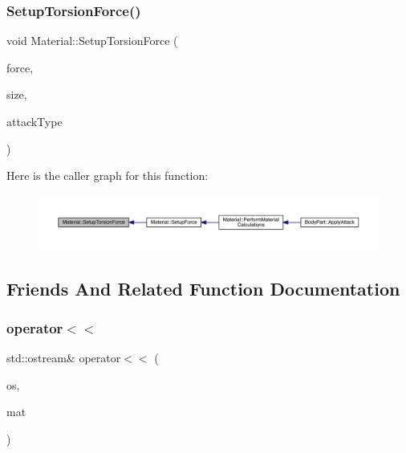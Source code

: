 \subsubsection{\texorpdfstring{Setup\+Torsion\+Force()}{SetupTorsionForce()}}
{\footnotesize\ttfamily void Material\+::\+Setup\+Torsion\+Force (\begin{DoxyParamCaption}\item[{float}]{force,  }\item[{float}]{size,  }\item[{\mbox{\hyperlink{_enum_types_8hpp_a904b2f9c8f3951116c343784c59d6afe}{Attack\+Type}}}]{attack\+Type }\end{DoxyParamCaption})\hspace{0.3cm}{\ttfamily [private]}}

Here is the caller graph for this function\+:
\nopagebreak
\begin{figure}[H]
\begin{center}
\leavevmode
\includegraphics[width=350pt]{dc/dee/class_material_a767010a40d459c05e14afc641217a21b_icgraph}
\end{center}
\end{figure}


\subsection{Friends And Related Function Documentation}
\mbox{\label{class_material_a5bfba11792fa55afcf4fec622c4a4f4b}} 
\subsubsection{\texorpdfstring{operator$<$$<$}{operator<<}}
{\footnotesize\ttfamily std\+::ostream\& operator$<$$<$ (\begin{DoxyParamCaption}\item[{std\+::ostream \&}]{os,  }\item[{const \mbox{\hyperlink{class_material}{Material}} \&}]{mat }\end{DoxyParamCaption})\hspace{0.3cm}{\ttfamily [friend]}}




